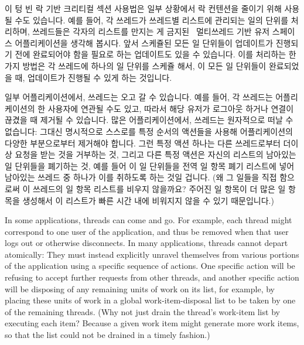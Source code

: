 {	\fi

	이 텅 빈 락 기반 크리티컬 섹션 사용법은 일부 상황에서 락 컨텐션을
	줄이기 위해 사용될 수도 있습니다.
	예를 들어, 각 쓰레드가 쓰레드별 리스트에 관리되는 일의 단위를 처리하며,
	쓰레드들은 각자의 리스트를 만지는 게
	금지된~\cite{PaulEMcKenney2012EmptyLocks} 멀티쓰레드 기반 유저 스페이스
	어플리케이션을 생각해 봅시다.
	앞서 스케쥴된 모든 일 단위들이 업데이트가 진행되기 전에 완료되어야 함을
	필요로 하는 업데이트도 있을 수 있습니다.
	이를 처리하는 한가지 방법은 각 쓰레드에 하나의 일 단위를 스케쥴 해서,
	이 모든 일 단위들이 완료되었을 때, 업데이트가 진행될 수 있게 하는
	것입니다.

	일부 어플리케이션에서, 쓰레드는 오고 갈 수 있습니다.
	예를 들어, 각 쓰레드는 어플리케이션의 한 사용자에 연관될 수도 있고,
	따라서 해당 유저가 로그아웃 하거나 연결이 끊겼을 때 제거될 수 있습니다.
	많은 어플리케이션에서, 쓰레드는 원자적으로 떠날 수 없습니다: 그대신
	명시적으로 스스로를 특정 순서의 액션들을 사용해 어플리케이션의 다양한
	부분으로부터 제거해야 합니다.
	그런 특정 액션 하나는 다른 쓰레드로부터 더이상 요청을 받는 것을
	거부하는 것, 그리고 다른 특정 액션은 자신의 리스트의 남아있는 일
	단위들을 폐기하는 것, 예를 들어 이 일 단위들을 전역 일 항목 폐기
	리스트에 넣어 남아있는 쓰레드 중 하나가 이를 취하도록 하는 것일 겁니다.
	(왜 그 일들을 직접 함으로써 이 쓰레드의 일 항목 리스트를 비우지
	않을까요?
	주어진 일 항목이 더 많은 일 항목을 생성해서 이 리스트가 빠른 시간 내에
	비워지지 않을 수 있기 때문입니다.)

	\iffalse

	In some applications, threads can come and go.
	For example, each thread might correspond to one user of the
	application, and thus be removed when that user logs out or
	otherwise disconnects.
	In many applications, threads cannot depart atomically: They must
	instead explicitly unravel themselves from various portions of
	the application using a specific sequence of actions.
	One specific action will be refusing to accept further requests
	from other threads, and another specific action will be disposing
	of any remaining units of work on its list, for example, by
	placing these units of work in a global work-item-disposal list
	to be taken by one of the remaining threads.
	(Why not just drain the thread's work-item list by executing
	each item?
	Because a given work item might generate more work items, so
	that the list could not be drained in a timely fashion.)

}
